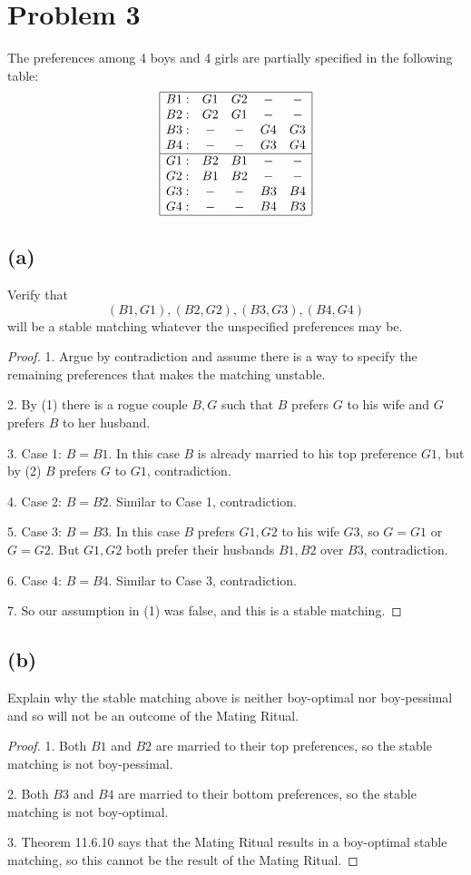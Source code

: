 \documentclass[14pt]{extarticle}
\begin{document}
\section{Problem 3}
The preferences among 4 boys and 4 girls are partially specified in the following table:
$$
\begin{array}{|c c c c c|}
\hline
B1: & G1 & G2 & - & - \\
B2: & G2 & G1 & - & - \\
B3: & - & - & G4 & G3 \\
B4: & - & - & G3 & G4 \\
\hline 
G1: & B2 & B1 & - & - \\
G2: & B1 & B2 & - & - \\
G3: & - & - & B3 & B4 \\
G4: & - & - & B4 & B3 \\
\hline 
\end{array}
$$
\subsection{(a)}
Verify that
$$
(B1, G1), (B2, G2), (B3, G3), (B4, G4)
$$
will be a stable matching whatever the unspecified preferences may be.
\begin{proof}
1. Argue by contradiction and assume there is a way to specify the remaining preferences that makes the matching unstable.

2. By (1) there is a rogue couple $B, G$ such that $B$ prefers $G$ to his wife and $G$ prefers $B$ to her husband.

3. Case 1: $B = B1$. In this case $B$ is already married to his top preference $G1$, but by (2) $B$ prefers $G$ to $G1$, contradiction.

4. Case 2: $B = B2$. Similar to Case 1, contradiction.

5. Case 3: $B = B3$. In this case $B$ prefers $G1, G2$ to his wife $G3$, so $G = G1$ or $G = G2$. But $G1, G2$ both prefer their husbands $B1, B2$ over $B3$, contradiction.

6. Case 4: $B = B4$. Similar to Case 3, contradiction.

7. So our assumption in (1) was false, and this is a stable matching.

\end{proof}
\subsection{(b)}
Explain why the stable matching above is neither boy-optimal nor boy-pessimal and so will not be an outcome of the Mating Ritual.
\begin{proof}
1. Both $B1$ and $B2$ are married to their top preferences, so the stable matching is not boy-pessimal.

2. Both $B3$ and $B4$ are married to their bottom preferences, so the stable matching is not boy-optimal. 

3. Theorem 11.6.10 says that the Mating Ritual results in a boy-optimal stable matching, so this cannot be the result of the Mating Ritual.
\end{proof}
\end{document}
